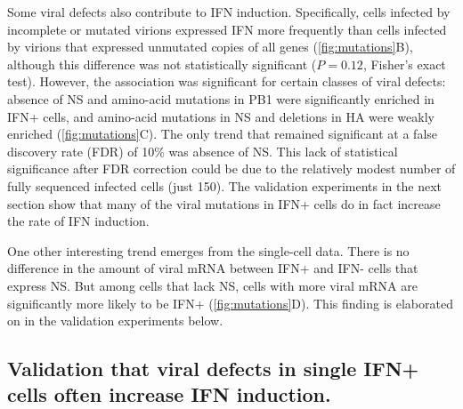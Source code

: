 \documentclass[lineno]{asm-article}
\newcommand{\FIG}[1]{\autoref{fig:#1}}
\begin{document}
Some viral defects also contribute to IFN induction.
Specifically, cells infected by incomplete or mutated virions expressed IFN more frequently than cells infected by virions that expressed unmutated copies of all genes (\FIG{mutations}B), although this difference was not statistically significant ($P = 0.12$, Fisher's exact test).
However, the association was significant for certain classes of viral defects: absence of NS and amino-acid mutations in PB1 were significantly enriched in IFN+ cells, and amino-acid mutations in NS and deletions in HA were weakly enriched (\FIG{mutations}C).
The only trend that remained significant at a false discovery rate (FDR) of 10\% was absence of NS.
This lack of statistical significance after FDR correction could be due to the relatively modest number of fully sequenced infected cells (just 150).
The validation experiments in the next section show that many of the viral mutations in IFN+ cells do in fact increase the rate of IFN induction.

One other interesting trend emerges from the single-cell data.
There is no difference in the amount of viral mRNA between IFN+ and IFN- cells that express NS.
But among cells that lack NS, cells with more viral mRNA are significantly more likely to be IFN+ (\FIG{mutations}D).
This finding is elaborated on in the validation experiments below.

\subsection{Validation that viral defects in single IFN+ cells often increase IFN induction.}
\end{document}
